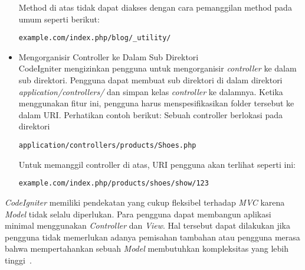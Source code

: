 \begin{itemize}
		Method di atas tidak dapat diakses dengan cara pemanggilan method pada umum seperti berikut:
		\begin{lstlisting}[backgroundcolor = \color{lightgray}]
example.com/index.php/blog/_utility/
		\end{lstlisting}
		
		\item Mengorganisir Controller ke Dalam Sub Direktori \\
		CodeIgniter mengizinkan pengguna untuk mengorganisir \textit{controller} ke dalam sub direktori. Pengguna dapat membuat sub direktori di dalam direktori \textit{application/controllers/} dan simpan kelas \textit{controller} ke dalamnya. Ketika menggunakan fitur ini, pengguna harus menspesifikasikan folder tersebut ke dalam URI. Perhatikan contoh berikut:
		Sebuah controller berlokasi pada direktori
		\begin{lstlisting}[backgroundcolor = \color{lightgray}]
application/controllers/products/Shoes.php
		\end{lstlisting}
		Untuk memanggil controller di atas, URI pengguna akan terlihat seperti ini:
		\begin{lstlisting}[backgroundcolor = \color{lightgray}]
example.com/index.php/products/shoes/show/123
		\end{lstlisting}
	\end{itemize}

\textit{CodeIgniter} memiliki pendekatan yang cukup fleksibel terhadap \textit{MVC} karena \textit{Model} tidak selalu diperlukan. Para pengguna dapat membangun aplikasi minimal  menggunakan \textit{Controller} dan \textit{View}. Hal tersebut dapat dilakukan jika pengguna tidak memerlukan adanya pemisahan tambahan atau pengguna merasa bahwa mempertahankan sebuah \textit{Model} membutuhkan kompleksitas yang lebih tinggi~\cite{bcit:17:cidoc}. 

